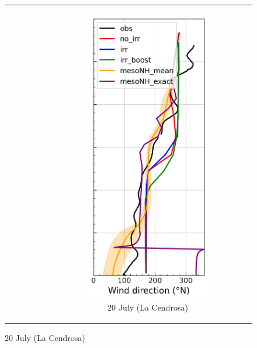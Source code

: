 \begin{figure}[hbtp]
{\begin{tabular}{@{}cccc@{}}
\begin{subfigure}[t]{0.283\textwidth}
        \end{subfigure} &
        \begin{subfigure}[t]{0.283\textwidth}
            \caption{20 July (La Cendrosa)}
            \includegraphics[width=\textwidth]{images/chap5/profiles/profile_cendrosa_wind_direction_2007_.png}

\end{subfigure}
\end{tabular}}
\end{figure}

